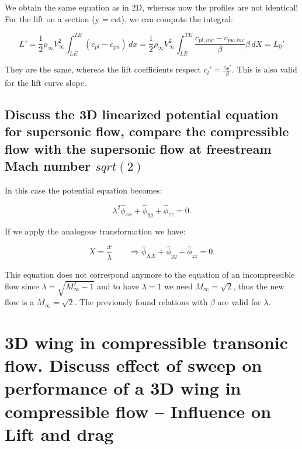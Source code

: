 \documentclass[british,french,11pt, a4paper, openany]{article}
\begin{document}
We obtain the same equation as in 2D, whereas now the profiles are not identical! For the lift on a section (y = cst), we can compute the integral:

\begin{equation}
L' = \frac{1}{2} \rho _\infty V_\infty ^2\int _{LE} ^{TE} (c_{pl} - c_{pu})\, dx
= \frac{1}{2} \rho _\infty V_\infty ^2\int _{LE} ^{TE} \frac{c_{pl,inc} - c_{pu,inc}}{\beta} \beta\, dX = L_0'
\end{equation}

They are the same, whereas the lift coefficients respect $c_l' = \frac{c_{l0}'}{\beta}$. This is also valid for the lift curve slope.

\subsection{Discuss the 3D linearized potential equation for supersonic flow, compare the compressible flow with the supersonic flow at freestream Mach number $sqrt(2)$}
In this case the potential equation becomes:

\begin{equation}
\lambda ^2 \hat{\phi} _{xx} + \hat{\phi} _{yy} + \hat{\phi} _{zz} = 0.
\end{equation}

If we apply the analogous transformation we have:

\begin{equation}
X = \frac{x}{\lambda} \qquad \Rightarrow  \hat{\phi} _{XX} + \hat{\phi} _{yy} + \hat{\phi} _{zz} = 0.
\end{equation}

This equation does not correspond anymore to the equation of an incompressible flow since $\lambda = \sqrt{M_\infty ^2 - 1}$ and to have $\lambda = 1$ we need $M_\infty = \sqrt{2}$, thus the new flow is a $M_\infty = \sqrt{2}$. The previously found relations with $\beta$ are valid for $\lambda$.




\section{3D wing in compressible transonic flow. Discuss effect of sweep on performance of a 3D wing in compressible flow -- Influence on Lift and drag}
\end{document}
